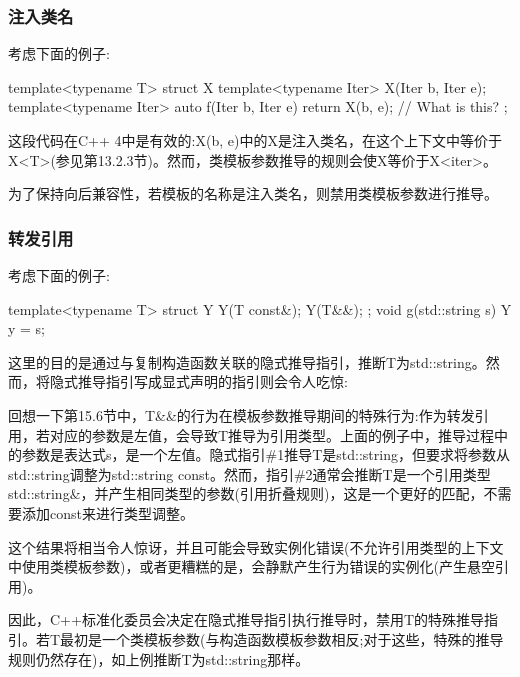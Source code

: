\subsubsection{注入类名}

考虑下面的例子:

\begin{cpp}
template<typename T> struct X {
	template<typename Iter> X(Iter b, Iter e);
	template<typename Iter> auto f(Iter b, Iter e) {
		return X(b, e); // What is this?
	}
};
\end{cpp}

这段代码在C++ 4中是有效的:X(b, e)中的X是注入类名，在这个上下文中等价于X<T>(参见第13.2.3节)。然而，类模板参数推导的规则会使X等价于X<iter>。

为了保持向后兼容性，若模板的名称是注入类名，则禁用类模板参数进行推导。


\subsubsection{转发引用}

考虑下面的例子:

\begin{cpp}
template<typename T> struct Y {
	Y(T const&);
	Y(T&&);
};
void g(std::string s) {
	Y y = s;
}
\end{cpp}

这里的目的是通过与复制构造函数关联的隐式推导指引，推断T为std::string。然而，将隐式推导指引写成显式声明的指引则会令人吃惊:


回想一下第15.6节中，T\&\&的行为在模板参数推导期间的特殊行为:作为转发引用，若对应的参数是左值，会导致T推导为引用类型。上面的例子中，推导过程中的参数是表达式s，是一个左值。隐式指引\#1推导T是std::string，但要求将参数从std::string调整为std::string const。然而，指引\#2通常会推断T是一个引用类型std::string\&，并产生相同类型的参数(引用折叠规则)，这是一个更好的匹配，不需要添加const来进行类型调整。

这个结果将相当令人惊讶，并且可能会导致实例化错误(不允许引用类型的上下文中使用类模板参数)，或者更糟糕的是，会静默产生行为错误的实例化(产生悬空引用)。

因此，C++标准化委员会决定在隐式推导指引执行推导时，禁用T的特殊推导指引。若T最初是一个类模板参数(与构造函数模板参数相反;对于这些，特殊的推导规则仍然存在)，如上例推断T为std::string那样。

